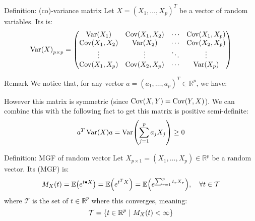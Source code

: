 \documentclass[a4paper]{article}
\begin{document}
\begin{parag}{Definition: (co)-variance matrix}
    Let $X = \left(X_1, \ldots, X_p\right)^T$ be a vector of random variables. Its  is: 
    \[\Var\left(X\right)_{p\times p} = \begin{pmatrix} \Var\left(X_1\right) & \Cov\left(X_1, X_2\right) & \cdots & \Cov\left(X_1, X_p\right) \\ \Cov\left(X_1, X_2\right) & \Var\left(X_2\right) & \cdots & \Cov\left(X_2, X_p\right) \\ \vdots & \vdots & \ddots & \vdots \\ \Cov\left(X_1, X_p\right) & \Cov\left(X_2, X_p\right) & \cdots & \Var\left(X_p\right) \end{pmatrix} \]

    \begin{subparag}{Remark}
        We notice that, for any vector $a = \left(a_1, \ldots, a_p\right)^T \in \mathbb{R}^p$, we have:

        However this matrix is symmetric (since $\Cov\left(X, Y\right) = \Cov\left(Y, X\right)$). We can combine this with the following fact to get this matrix is positive semi-definite: 
        \[a^T \Var\left(X\right) a = \Var\left(\sum_{j=1}^{p} a_j X_j\right) \geq 0\]
    \end{subparag}
\end{parag}

\begin{parag}{Definition: MGF of random vector}
    Let $X_{p\times 1} = \left(X_1, \ldots, X_p\right) \in \mathbb{R}^p$ be a random vector. Its  (MGF) is: 
    \[M_X\left(t\right) = \exval\left(e^{t \dotprod X}\right) = \exval\left(e^{t^T X}\right) = \exval\left(e^{\sum_{r=1}^{p} t_r X_r}\right), \mathspace \forall t \in \mathcal{T}\]
    where $\mathcal{T}$ is the set of $t \in \mathbb{R}^p$ where this converges, meaning:
    \[\mathcal{T} = \left\{t \in \mathbb{R}^p \suchthat M_X\left(t\right) < \infty\right\}\]
\end{parag}
\end{document}
